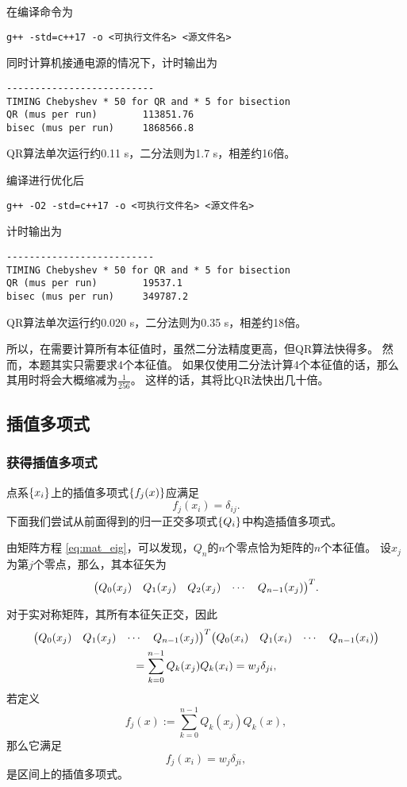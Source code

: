 \documentclass[a4paper,unicode]{report}
\begin{document}
在编译命令为
\begin{verbatim}
g++ -std=c++17 -o <可执行文件名> <源文件名>
\end{verbatim}
同时计算机接通电源的情况下，计时输出为
\begin{verbatim}
--------------------------
TIMING Chebyshev * 50 for QR and * 5 for bisection
QR (mus per run)        113851.76
bisec (mus per run)     1868566.8
\end{verbatim}

QR算法单次运行约0.11 s，二分法则为1.7 s，相差约16倍。

编译进行优化后
\begin{verbatim}
g++ -O2 -std=c++17 -o <可执行文件名> <源文件名>
\end{verbatim}
计时输出为
\begin{verbatim}
--------------------------
TIMING Chebyshev * 50 for QR and * 5 for bisection
QR (mus per run)        19537.1
bisec (mus per run)     349787.2
\end{verbatim}
QR算法单次运行约0.020 s，二分法则为0.35 s，相差约18倍。

所以，在需要计算所有本征值时，虽然二分法精度更高，但QR算法快得多。
然而，本题其实只需要求4个本征值。
如果仅使用二分法计算4个本征值的话，那么其用时将会大概缩减为$\frac{1}{256}$。
这样的话，其将比QR法快出几十倍。

\subsection{插值多项式}
\subsubsection{获得插值多项式}
点系$\qty{x_i}$上的插值多项式$\qty{f_j(x)}$应满足
\begin{equation}
    f_j(x_i) = \delta_{ij}.
\end{equation}
下面我们尝试从前面得到的归一正交多项式$\qty{Q_i}$中构造插值多项式。

由矩阵方程 \eqref{eq:mat_eig}，可以发现，$Q_n$的$n$个零点恰为矩阵的$n$个本征值。
设$x_j$为第$j$个零点，那么，其本征矢为
\begin{equation}
    \mqty(
        Q_0(x_j)&   Q_1(x_j)&   Q_2(x_j)&   \cdots&    Q_{n-1}(x_j)
    )^T.
\end{equation}

对于实对称矩阵，其所有本征矢正交，因此
\begin{multline}
    \mqty(
        Q_0(x_j)&   Q_1(x_j)&   \cdots&    Q_{n-1}(x_j)
    )^T\mqty(
        Q_0(x_i)&   Q_1(x_i)&   \cdots&    Q_{n-1}(x_i)
    ) \\
    = \sum_{k=0}^{n-1} Q_k(x_j)Q_k(x_i) = w_j\delta_{ji},
\end{multline}
若定义
\begin{equation}
    f_j(x) := \sum_{k=0}^{n-1} Q_k(x_j)Q_k(x),
\end{equation}
那么它满足
\begin{equation} \label{eq:interpolation_poly}
    f_j(x_i) = w_j\delta_{ji},
\end{equation}
是区间上的插值多项式。
\end{document}

